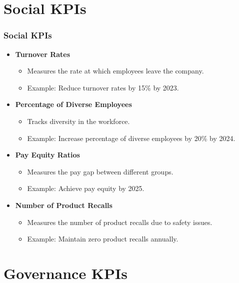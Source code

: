 \documentclass{beamer}
\begin{document}
\section{Social KPIs}

\begin{frame}
\frametitle{Social KPIs}
\begin{itemize}
    \item \textbf{Turnover Rates}
        \begin{itemize}
            \item Measures the rate at which employees leave the company.
            \item Example: Reduce turnover rates by 15\% by 2023.
        \end{itemize}
    \item \textbf{Percentage of Diverse Employees}
        \begin{itemize}
            \item Tracks diversity in the workforce.
            \item Example: Increase percentage of diverse employees by 20\% by 2024.
        \end{itemize}
    \item \textbf{Pay Equity Ratios}
        \begin{itemize}
            \item Measures the pay gap between different groups.
            \item Example: Achieve pay equity by 2025.
        \end{itemize}
    \item \textbf{Number of Product Recalls}
        \begin{itemize}
            \item Measures the number of product recalls due to safety issues.
            \item Example: Maintain zero product recalls annually.
        \end{itemize}
\end{itemize}
\end{frame}

\section{Governance KPIs}
\end{document}
